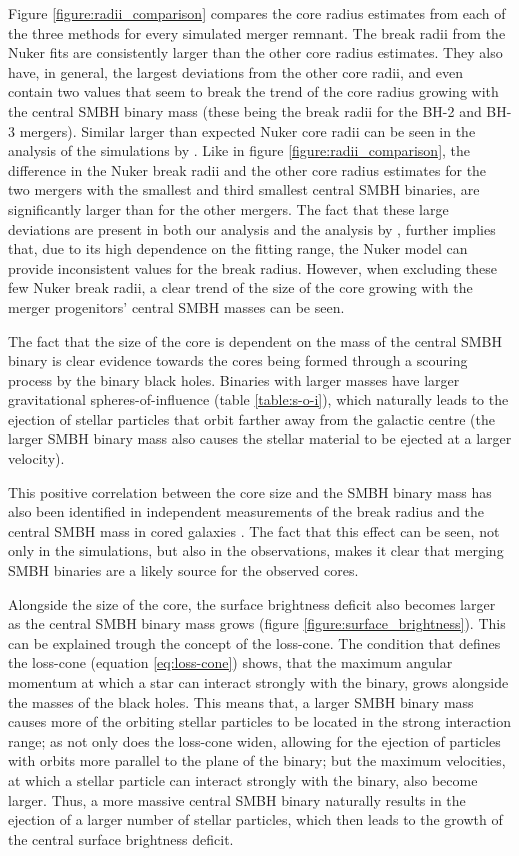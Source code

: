 \documentclass[english, twoside]{HYgradu}
\begin{document}
Figure \ref{figure:radii_comparison} compares the core radius estimates from each of the three methods for every simulated merger remnant. The break radii from the Nuker fits are consistently larger than the other core radius estimates. They also have, in general, the largest deviations from the other core radii, and even contain two values that seem to break the trend of the core radius growing with the central SMBH binary mass (these being the break radii for the BH-2 and BH-3 mergers). Similar larger than expected Nuker core radii can be seen in the analysis of the simulations by \cite{Rantala2018}. Like in figure \ref{figure:radii_comparison}, the difference in the Nuker break radii and the other core radius estimates for the two mergers with the smallest and third smallest central SMBH binaries, are significantly larger than for the other mergers. The fact that these large deviations are present in both our analysis and the analysis by \cite{Rantala2018}, further implies that, due to its high dependence on the fitting range, the Nuker model can provide inconsistent values for the break radius. However, when excluding these few Nuker break radii, a clear trend of the size of the core growing with the merger progenitors' central SMBH masses can be seen.

The fact that the size of the core is dependent on the mass of the central SMBH binary is clear evidence towards the cores being formed through a scouring process by the binary black holes. Binaries with larger masses have larger gravitational spheres-of-influence (table \ref{table:s-o-i}), which naturally leads to the ejection of stellar particles that orbit farther away from the galactic centre (the larger SMBH binary mass also causes the stellar material to be ejected at a larger velocity). 

This positive correlation between the core size and the SMBH binary mass has also been identified in independent measurements of the break radius and the central SMBH mass in cored galaxies \citep[e.g.][]{deRuiter2005, Lauer2007Cusp, Thomas2016}. The fact that this effect can be seen, not only in the simulations, but also in the observations, makes it clear that merging SMBH binaries are a likely source for the observed cores.

Alongside the size of the core, the surface brightness deficit also becomes larger as the central SMBH binary mass grows (figure \ref{figure:surface_brightness}). This can be explained trough the concept of the loss-cone. The condition that defines the loss-cone (equation \ref{eq:loss-cone}) shows, that the maximum angular momentum at which a star can interact strongly with the binary, grows alongside the masses of the black holes. This means that, a larger SMBH binary mass causes more of the orbiting stellar particles to be located in the strong interaction range; as not only does the loss-cone widen, allowing for the ejection of particles with orbits more parallel to the plane of the binary; but the maximum velocities, at which a stellar particle can interact strongly with the binary, also become larger. Thus, a more massive central SMBH binary naturally results in the ejection of a larger number of stellar particles, which then leads to the growth of the central surface brightness deficit.  
\end{document}
